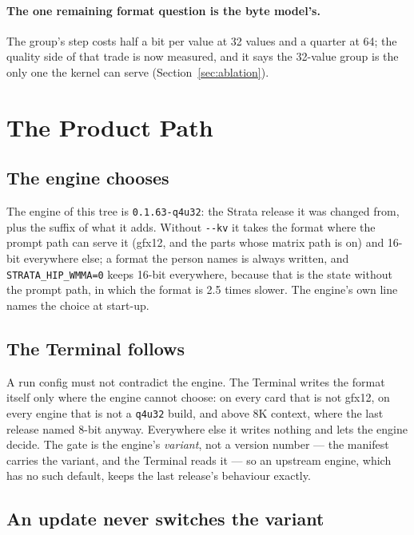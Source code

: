 \documentclass[10pt,twocolumn]{article}
\begin{document}
\paragraph{The one remaining format question is the byte model's.} The group's step costs half a bit per
value at 32 values and a quarter at 64; the quality side of that trade is now measured, and it says the
32-value group is the only one the kernel can serve (Section~\ref{sec:ablation}).

\section{The Product Path}
\label{sec:product}

\subsection{The engine chooses}

The engine of this tree is \texttt{0.1.63-q4u32}: the Strata release it was changed from, plus the
suffix of what it adds. Without \texttt{-{}-kv} it takes the format where the prompt path can serve it
(gfx12, and the parts whose matrix path is on) and 16-bit everywhere else; a format the person names is
always written, and \texttt{STRATA\_HIP\_WMMA=0} keeps 16-bit everywhere, because that is the state
without the prompt path, in which the format is 2.5 times slower. The engine's own line names the choice
at start-up.

\subsection{The Terminal follows}

A run config must not contradict the engine. The Terminal writes the format itself only where the engine
cannot choose: on every card that is not gfx12, on every engine that is not a \texttt{q4u32} build, and
above 8K context, where the last release named 8-bit anyway. Everywhere else it writes nothing and lets
the engine decide. The gate is the engine's \emph{variant}, not a version number --- the manifest carries
the variant, and the Terminal reads it --- so an upstream engine, which has no such default, keeps the
last release's behaviour exactly.

\subsection{An update never switches the variant}
\end{document}

